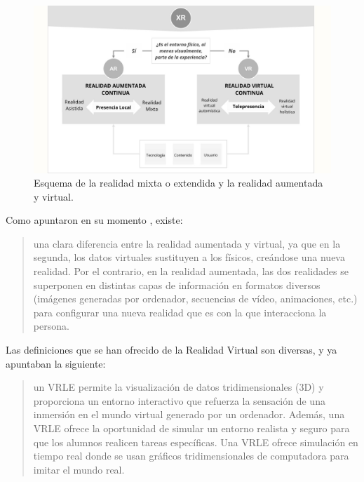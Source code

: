 \documentclass[spanish]{textolivre}
\begin{document}
\begin{figure}
    \centering
    \begin{minipage}{.85\textwidth}
    \includegraphics[width=\linewidth]{Fig1.png}
    \caption{Esquema de la realidad mixta o extendida y la realidad aumentada y virtual.}
    \label{fig1}
    \end{minipage}
\end{figure}

 Como apuntaron en su momento \textcite[p.~12]{cabero2022ecosystem}, existe: 

\begin{quote}
una clara diferencia entre la realidad aumentada y virtual, ya que en la segunda, los datos virtuales sustituyen a los físicos, creándose una nueva realidad. Por el contrario, en la realidad aumentada, las dos realidades se superponen en distintas capas de información en formatos diversos (imágenes generadas por ordenador, secuencias de vídeo, animaciones, etc.) para configurar una nueva realidad que es con la que interacciona la persona.
\end{quote}

Las definiciones que se han ofrecido de la Realidad Virtual son diversas, y ya \textcite[p.~1171]{huang2010investigating} apuntaban la siguiente: 

\begin{quote}
un VRLE permite la visualización de datos tridimensionales (3D) y proporciona un entorno interactivo que refuerza la sensación de una inmersión en el mundo virtual generado por un ordenador. Además, una VRLE ofrece la oportunidad de simular un entorno realista y seguro para que los alumnos realicen tareas específicas. Una VRLE ofrece simulación en tiempo real donde se usan gráficos tridimensionales de computadora para imitar el mundo real.
\end{quote}
\end{document}
